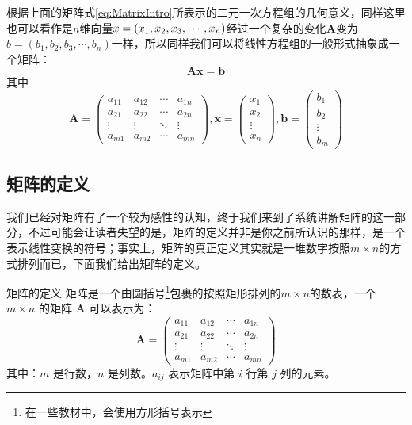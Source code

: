 根据上面的矩阵式\ref{eq:MatrixIntro}所表示的二元一次方程组的几何意义，同样这里也可以看作是$n$维向量$x=(x_1,x_2,\\x_3,\cdots,x_n)$经过一个复杂的变化$\mathbf{A}$变为$b=(b_1,b_2,b_3,\cdots,b_n)$一样，所以同样我们可以将线性方程组的一般形式抽象成一个矩阵：$$\mathbf{A} \boldsymbol{x} = \boldsymbol{b}$$其中$$\mathbf{A} = \begin{pmatrix}
	a_{11} & a_{12} & \cdots & a_{1n} \\
	a_{21} & a_{22} & \cdots & a_{2n} \\
	\vdots & \vdots & \ddots & \vdots \\
	a_{m1} & a_{m2} & \cdots & a_{mn}
	\end{pmatrix},\boldsymbol{x}=\begin{pmatrix}
		x_1 \\
		x_2 \\
		\vdots \\
		x_n
		\end{pmatrix},\boldsymbol{b}=\begin{pmatrix}
			b_1 \\
			b_2 \\
			\vdots \\
			b_m
			\end{pmatrix}$$

\subsection{矩阵的定义}

我们已经对矩阵有了一个较为感性的认知，终于我们来到了系统讲解矩阵的这一部分，不过可能会让读者失望的是，矩阵的定义并非是你之前所认识的那样，是一个表示线性变换的符号；事实上，矩阵的真正定义其实就是一堆数字按照$m\times n$的方式排列而已，下面我们给出矩阵的定义。

\begin{definition}{矩阵的定义}
	矩阵是一个由圆括号\footnote{在一些教材中，会使用方形括号表示}包裹的按照矩形排列的$m\times n$的数表，一个 $m \times n$ 的矩阵 $ \mathbf{A} $ 可以表示为：
	$$\mathbf{A} = \begin{pmatrix}
		a_{11} & a_{12} & \cdots & a_{1n} \\
		a_{21} & a_{22} & \cdots & a_{2n} \\
		\vdots & \vdots & \ddots & \vdots \\
		a_{m1} & a_{m2} & \cdots & a_{mn}
		\end{pmatrix}$$其中：$ m $ 是行数，$ n $ 是列数。$ a_{ij} $ 表示矩阵中第 $ i $ 行第 $ j $ 列的元素。
\end{definition}


